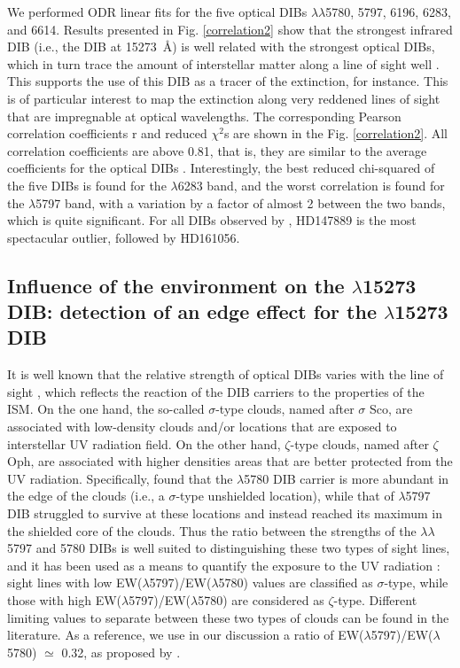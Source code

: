 \documentclass[printer]{aa} %
\begin{document}
We performed ODR linear fits for the five optical DIBs $\lambda\lambda$5780, 5797, 6196, 6283, and 6614. 
Results presented in Fig. \ref{correlation2}  show that the strongest infrared DIB (i.e., the DIB at 15273~\AA) is well related with the strongest optical DIBs, which in turn trace the amount of interstellar matter along a line of sight well \citep[e.g.,][]{Merrill34,Herbig93}. This supports the use of this DIB as a tracer of the extinction,
for instance. This is of particular interest to map the extinction along very reddened lines of sight that are impregnable at optical wavelengths. The corresponding Pearson correlation coefficients r and reduced $\chi^{2}$s are shown in the Fig. \ref{correlation2}. All correlation coefficients are above 0.81, that is, they are similar to the average coefficients for the optical DIBs \citep{Friedman11}. Interestingly, the best reduced chi-squared
of the five DIBs is found for the $\lambda$6283 band, and the worst correlation is found for the $\lambda$5797 band, with a variation by a factor of almost 2 between the two bands, which is quite significant. For all DIBs observed by \cite{Cox14}, HD147889 is the most spectacular outlier, followed  by HD161056. 

\subsection{Influence of the environment on the $\lambda$15273 DIB: detection of an edge effect for the $\lambda$15273 DIB}

It is well known that the relative strength of optical DIBs varies with the line of sight \citep[e.g.,][]{Krelowski92,Cami97,Cox06,Friedman11,Vos11,Cordiner13},
which reflects the reaction of the DIB carriers to the properties of the ISM.
On the one hand, the so-called  $\sigma$-type clouds, named after $\sigma$ Sco, are associated with low-density clouds and/or locations that are exposed to interstellar UV radiation field. On the other hand, $\zeta$-type clouds, named after $\zeta$ Oph, are associated with higher densities areas that are better protected from the UV radiation.
Specifically, \citet{Cami97} found that the $\lambda$5780 DIB carrier is more abundant in the edge of the clouds  (i.e., a $\sigma$-type unshielded location), while  that of $\lambda$5797 DIB struggled to survive at these locations and instead reached its maximum in the shielded core of the clouds. Thus the ratio between the strengths of the $\lambda\lambda$5797 and 5780 DIBs is well suited to distinguishing  these two types of sight lines, and it has been used  as a means to quantify the exposure to the UV radiation \citep[e.g.,][]{MaizApellaniz15,Cordiner13}: sight lines with low EW($\lambda$5797)/EW($\lambda$5780) values are classified as $\sigma$-type, while those with high EW($\lambda$5797)/EW($\lambda$5780) are considered as $\zeta$-type. Different limiting values to separate between these two types of clouds can be found in the literature. As a reference, we use in our discussion a ratio  of EW($\lambda$5797)/EW($\lambda$5780) $\simeq$ 0.32, as proposed by \citet{Vos11}.
\end{document}
